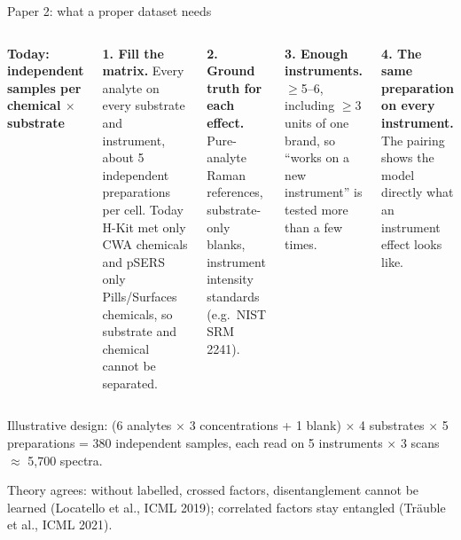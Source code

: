 \documentclass[aspectratio=169,10pt]{beamer}
\newcommand{\takeaway}[1]{%
  \par\vspace{2pt}\noindent\colorbox{cTake}{\parbox{\dimexpr\textwidth-2\fboxsep\relax}{\small #1}}}
\newcommand{\src}[1]{{\par\vspace{1pt}\tiny\color{cInk2}#1\par}}
\begin{document}
\begin{frame}{Paper 2: what a proper dataset needs}
\begin{columns}[T,onlytextwidth]
\centering
\scriptsize\textbf{Today: independent samples per chemical $\times$ substrate}\par\smallskip

\small
\textbf{1. Fill the matrix.} Every analyte on every substrate and instrument, about 5 independent preparations per cell. Today H-Kit met only CWA chemicals and pSERS only Pills/Surfaces chemicals, so substrate and chemical cannot be separated.

\smallskip
\textbf{2. Ground truth for each effect.} Pure-analyte Raman references, substrate-only blanks, instrument intensity standards (e.g.\ NIST SRM 2241).

\smallskip
\textbf{3. Enough instruments.} $\geq$5--6, including $\geq$3 units of one brand, so ``works on a new instrument'' is tested more than a few times.

\smallskip
\textbf{4. The same preparation on every instrument.} The pairing shows the model directly what an instrument effect looks like.
\end{columns}
\takeaway{Illustrative design: (6 analytes $\times$ 3 concentrations + 1 blank) $\times$ 4 substrates $\times$ 5 preparations = 380 independent samples, each read on 5 instruments $\times$ 3 scans $\approx$ 5,700 spectra.}
\src{Theory agrees: without labelled, crossed factors, disentanglement cannot be learned (Locatello et al., ICML 2019); correlated factors stay entangled (Tr\"auble et al., ICML 2021).}
\end{frame}
\end{document}

